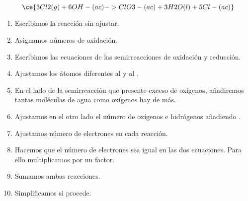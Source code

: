 \begin{frame}
\begin{overprint}
			$$
				\ce{3Cl2(g) + 6OH-(ac) -> ClO3-(ac) + 3H2O(l) + 5Cl-(ac)}
			$$
	\end{overprint}                 
	\begin{enumerate}[label={\alph*)},font={\color{red!50!black}\bfseries}]
		\item<1-> Escribimos la reacción sin ajustar.
		\item<2-> Asignamos números de oxidación.
		\item<3-> Escribimos las ecuaciones de las semirreacciones de oxidación y reducción.
		\item<4-> Ajustamos los átomos diferentes al  y al .
		\item<5-> En el lado de la semirreacción que presente exceso de oxígenos, añadiremos tantas moléculas de agua como oxígenos hay de más.
		\item<6-> Ajustamos en el otro lado el número de oxígenos e hidrógenos añadiendo .
		\item<7-> Ajustamos número de electrones en cada reacción.
		\item<8-> Hacemos que el número de electrones sea igual en las dos ecuaciones. Para ello multiplicamos por un factor.
		\item<10-> Sumamos ambas reacciones.
		\item<11-> Simplificamos si procede.
	\end{enumerate}
\end{frame}

